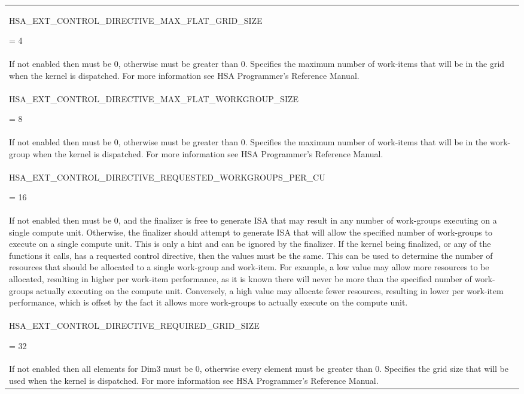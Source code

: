 \documentclass[final]{book}
\newcommand{\reftyp}[1]{#1}
\newcommand{\refenu}[1]{\reftyp{#1}}
\begin{document}
\begin{longtable}{@{\hspace{2em}}p{\linewidth-2em}}
\hspace{-2em}\hypertarget{group__FinalizerCoreApi_1gga143d9e622dfd7889d52fb5eb5ed1ffdba8f84c9f5303be293df76bf82b002299c}{\refenu{HSA_EXT_CONTROL_DIRECTIVE_MAX_FLAT_GRID_SIZE}} = 4\\If not enabled then must be 0, otherwise must be greater than 0. Specifies the maximum number of work-items that will be in the grid when the kernel is dispatched. For more information see HSA Programmer's Reference Manual.\\[2mm]
\hspace{-2em}\hypertarget{group__FinalizerCoreApi_1gga143d9e622dfd7889d52fb5eb5ed1ffdbaa0e6d7d860284c6cadde5c7e9db66968}{\refenu{HSA_EXT_CONTROL_DIRECTIVE_MAX_FLAT_WORKGROUP_SIZE}} = 8\\If not enabled then must be 0, otherwise must be greater than 0. Specifies the maximum number of work-items that will be in the work-group when the kernel is dispatched. For more information see HSA Programmer's Reference Manual.\\[2mm]
\hspace{-2em}\hypertarget{group__FinalizerCoreApi_1gga143d9e622dfd7889d52fb5eb5ed1ffdbae6659470b66232e7ec4a749a032dc95d}{\refenu{HSA_EXT_CONTROL_DIRECTIVE_REQUESTED_WORKGROUPS_PER_CU}} = 16\\If not enabled then must be 0, and the finalizer is free to generate ISA that may result in any number of work-groups executing on a single compute unit. Otherwise, the finalizer should attempt to generate ISA that will allow the specified number of work-groups to execute on a single compute unit. This is only a hint and can be ignored by the finalizer. If the kernel being finalized, or any of the functions it calls, has a requested control directive, then the values must be the same. This can be used to determine the number of resources that should be allocated to a single work-group and work-item. For example, a low value may allow more resources to be allocated, resulting in higher per work-item performance, as it is known there will never be more than the specified number of work-groups actually executing on the compute unit. Conversely, a high value may allocate fewer resources, resulting in lower per work-item performance, which is offset by the fact it allows more work-groups to actually execute on the compute unit.\\[2mm]
\hspace{-2em}\hypertarget{group__FinalizerCoreApi_1gga143d9e622dfd7889d52fb5eb5ed1ffdbaa9878485a06df4090cba80c85acb32be}{\refenu{HSA_EXT_CONTROL_DIRECTIVE_REQUIRED_GRID_SIZE}} = 32\\If not enabled then all elements for Dim3 must be 0, otherwise every element must be greater than 0. Specifies the grid size that will be used when the kernel is dispatched. For more information see HSA Programmer's Reference Manual.\\[2mm]

\end{longtable}
\end{document}
